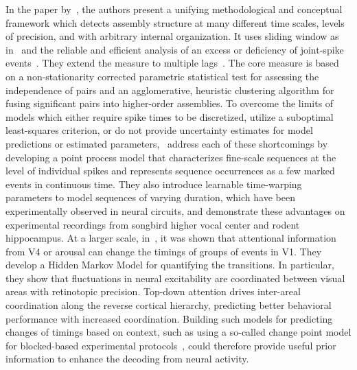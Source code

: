 \documentclass[brainsci, %
               review,submit,pdftex,moreauthors
               ]{Definitions/mdpi}
\begin{document}
In the paper by~\citet{russo_cell_2017}, the authors present a unifying methodological and conceptual framework which detects assembly structure at many different time scales, levels of precision, and with arbitrary internal organization. It uses  sliding window as in~\citep{grun_unitary_2002} and the reliable and efficient analysis of an excess or deficiency of joint-spike events~\citep{pipa_neuroxidence_2008}. They extend the measure to multiple lags~\citep{torre_synchronous_2016}. The core measure is based on a non-stationarity corrected parametric statistical test for assessing the independence of pairs and an agglomerative, heuristic clustering algorithm for fusing significant pairs into higher-order assemblies.  To overcome the limits of models which either require spike times to be discretized, utilize a suboptimal least-squares criterion, or do not provide uncertainty estimates for model predictions or estimated parameters,~\citep{williams_point_2020} address each of these shortcomings by developing a point process model that characterizes fine-scale sequences at the level of individual spikes and represents sequence occurrences as a few marked events in continuous time. They also introduce learnable time-warping parameters to model sequences of varying duration, which have been experimentally observed in neural circuits, and demonstrate these advantages on experimental recordings from songbird higher vocal center and rodent hippocampus.
At a larger scale, in~\citep{van_kempen_top-down_2021}, it was shown that attentional information from V4 or arousal can change the timings of groups of events in V1. They develop a Hidden Markov Model for quantifying the transitions. In particular, they show that fluctuations in neural excitability are coordinated between visual areas with retinotopic precision. Top-down attention drives inter-areal coordination along the reverse cortical hierarchy, predicting better behavioral performance with increased coordination. Building such models for predicting changes of timings based on context, such as using a so-called change point model for blocked-based experimental protocols~\citep{pasturel_humans_2020}, could therefore provide useful prior information to enhance the decoding from neural activity.
%
\end{document}
